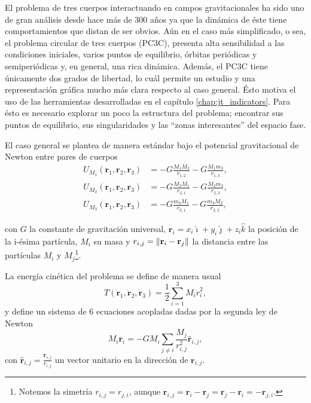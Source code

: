 El problema de tres cuerpos interactuando en campos gravitacionales ha sido uno de gran análisis desde hace más de 300 años ya que la dinámica de éste tiene comportamientos que distan de ser obvios. Aún en el caso más simplificado, o sea, el problema circular de tres cuerpos (PC3C), presenta alta sensibilidad a las condiciones iniciales, varios puntos de equilibrio, órbitas periódicas y semiperiódicas y, en general, una rica dinámica. Además, el PC3C tiene únicamente dos grados de libertad, lo cuál permite un estudio y una representación gráfica mucho más clara respecto al caso general. Ésto motiva el uso de las herramientas desarrolladas en el capítulo \ref{chap:jt_indicators}. Para ésto es necesario explorar un poco la estructura del problema; encontrar sus puntos de equilibrio, sus singularidades y las ``zonas interesantes'' del espacio fase.

El caso general se plantea de manera estándar bajo el potencial gravitacional de Newton entre pares de cuerpos 
\begin{align}
 U_{M_1}(\mathbf{r}_1,\mathbf{r}_2,\mathbf{r}_3) &= -G \frac{M_1 M_2}{r_{1,2}} - G \frac{M_1 m_3}{r_{1,3}}, \\
 U_{M_2}(\mathbf{r}_1,\mathbf{r}_2,\mathbf{r}_3) &= -G \frac{M_2 M_1}{r_{2,1}} - G \frac{M_2 m_3}{r_{2,3}}, \\
 U_{M_3}(\mathbf{r}_1,\mathbf{r}_2,\mathbf{r}_3) &= -G \frac{m_3 M_1}{r_{3,1}} - G \frac{m_3 M_2}{r_{3,2}},
 \label{eq:3body_potential}
\end{align}

con $G$ la constante de gravitación universal, $\mathbf{r}_i = x_i \hat{\imath} + y_i \hat{\jmath} + z_i \hat{k}$ la posición de la i-ésima partícula, $M_i$ su masa y $r_{i,j} = \left\lVert \mathbf{r}_i - \mathbf{r}_j\right\rVert$ la distancia entre las partículas $M_i$ y $M_j$\footnote{Notemos la simetría $r_{i,j} = r_{j,i}$, aunque $\mathbf{r}_{i,j} = \mathbf{r}_i - \mathbf{r}_j = \mathbf{r}_j - \mathbf{r}_i  = - \mathbf{r}_{j,i}$.}. 

La energía cinética del problema se define de manera usual 
\begin{equation}
 T(\dot{\mathbf{r}}_1,\dot{\mathbf{r}}_2,\dot{\mathbf{r}}_3) = \frac{1}{2} \sum_{i=1}^3 M_i \dot{r}_i^2,
 \label{eq:3body_kinetic}
\end{equation}
y define un sistema de 6 ecuaciones acopladas dadas por la segunda ley de Newton
\begin{equation}
 M_i \ddot{\mathbf{r}_i} = - G M_i \sum_{j\neq i} \frac{M_j}{r_{i,j}^2} \hat{\mathbf{r}}_{i,j},
 \label{eq:3body_eqs_motion}
\end{equation}
con $\hat{\mathbf{r}}_{i,j} = \frac{\mathbf{r}_{i,j}}{r_{i,j}}$ un vector unitario en la dirección de $\mathbf{r}_{i,j}$.

